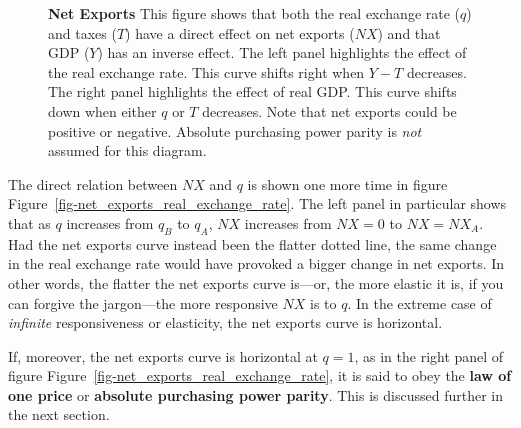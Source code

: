 \documentclass[
  letterpaper,
]{book}
\theoremstyle{plain}
\theoremstyle{remark}
\begin{document}
\begin{figure}


\caption{\label{fig-net_exports_general}\textbf{Net Exports} This figure
shows that both the real exchange rate (\(q\)) and taxes (\(T\)) have a
direct effect on net exports (\(NX\)) and that GDP (\(Y\)) has an
inverse effect. The left panel highlights the effect of the real
exchange rate. This curve shifts right when \(Y-T\) decreases. The right
panel highlights the effect of real GDP. This curve shifts down when
either \(q\) or \(T\) decreases. Note that net exports could be positive
or negative. Absolute purchasing power parity is \emph{not} assumed for
this diagram.}

\end{figure}%

The direct relation between \(NX\) and \(q\) is shown one more time in
figure Figure~\ref{fig-net_exports_real_exchange_rate}. The left panel
in particular shows that as \(q\) increases from \(q_B\) to \(q_A\),
\(NX\) increases from \(NX=0\) to \(NX=NX_A\). Had the net exports curve
instead been the flatter dotted line, the same change in the real
exchange rate would have provoked a bigger change in net exports. In
other words, the flatter the net exports curve is---or, the more elastic
it is, if you can forgive the jargon---the more responsive \(NX\) is to
\(q\). In the extreme case of \emph{infinite} responsiveness or
elasticity, the net exports curve is horizontal.

If, moreover, the net exports curve is horizontal at \(q=1\), as in the
right panel of figure Figure~\ref{fig-net_exports_real_exchange_rate},
it is said to obey the \textbf{law of one price} or \textbf{absolute
purchasing power parity}. This is discussed further in the next
section.
\end{document}
